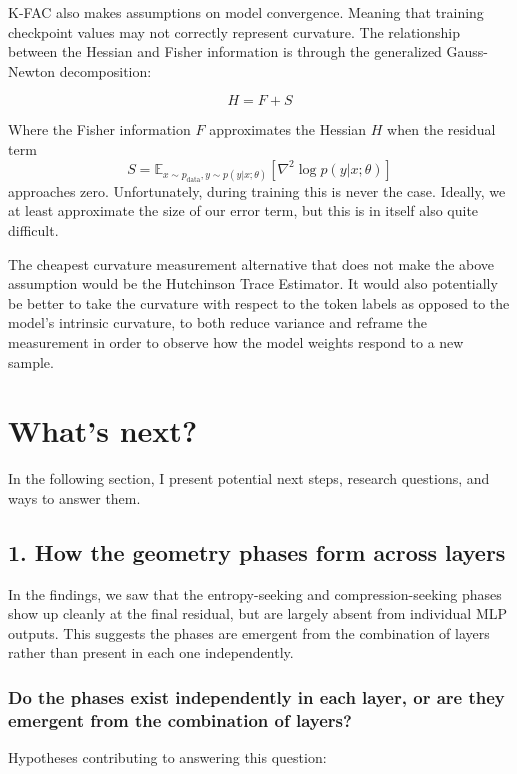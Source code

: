 \documentclass[11pt,a4paper]{article}
\begin{document}
K-FAC also makes assumptions on model convergence. Meaning that training checkpoint values may not correctly represent curvature. The relationship between the Hessian and Fisher information is through the generalized Gauss-Newton decomposition:

$$ H = F + S $$

Where the Fisher information $F$ approximates the Hessian $H$ when the residual term $$S = \mathbb{E}_{x \sim p_{\text{data}}, y \sim p(y|x;\theta)} [\nabla^2 \log p(y|x;\theta)]$$ approaches zero. Unfortunately, during training this is never the case. Ideally, we at least approximate the size of our error term, but this is in itself also quite difficult.

The cheapest curvature measurement alternative that does not make the above assumption would be the Hutchinson Trace Estimator. It would also potentially be better to take the curvature with respect to the token labels as opposed to the model's intrinsic curvature, to both reduce variance and reframe the measurement in order to observe how the model weights respond to a new sample.

\section{What's next?}

In the following section, I present potential next steps, research questions, and ways to answer them.

\subsection{1. How the geometry phases form across layers}

In the findings, we saw that the entropy-seeking and compression-seeking phases show up cleanly at the final residual, but are largely absent from individual MLP outputs. This suggests the phases are emergent from the combination of layers rather than present in each one independently.

\subsubsection{Do the phases exist independently in each layer, or are they emergent from the combination of layers?}

Hypotheses contributing to answering this question:
\end{document}
